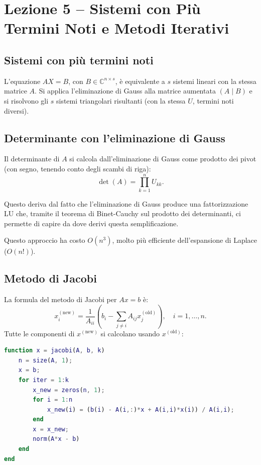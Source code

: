 \documentclass[12pt,a4paper,]{report}
\begin{document}
\section{Lezione 5 -- Sistemi con Più Termini Noti e Metodi Iterativi}

\subsection{Sistemi con più termini noti}

L'equazione $AX = B$, con $B \in \mathbb{C}^{n \times s}$, è equivalente a $s$
sistemi lineari con la stessa matrice $A$. Si applica l'eliminazione di Gauss alla matrice aumentata $(A \mid B)$ e si risolvono gli $s$ sistemi triangolari
risultanti (con la stessa $U$, termini noti diversi).

\subsection{Determinante con l'eliminazione di Gauss}

Il determinante di $A$ si calcola dall'eliminazione di Gauss come prodotto dei pivot (con segno, tenendo conto degli scambi di riga):
\[
  \det(A) = \prod_{k=1}^{n} U_{kk}.
\]
\begin{nota}
    Questo deriva dal fatto che l'eliminazione di Gauss produce una fattorizzazione LU che, tramite il teorema di Binet-Cauchy sul prodotto dei determinanti, ci permette di capire da dove derivi questa semplificazione.
\end{nota}
\noindent
Questo approccio ha costo $O(n^3)$, molto più efficiente dell'espansione di Laplace
($O(n!)$).

\subsection{Metodo di Jacobi}

La formula del metodo di Jacobi per $Ax = b$ è:
\[
  x_i^{(\text{new})} = \frac{1}{A_{ii}} \left( b_i - \sum_{j \neq i} A_{ij} x_j^{(\text{old})} \right), \quad i = 1, \ldots, n.
\]
Tutte le componenti di $x^{(\text{new})}$ si calcolano usando $x^{(\text{old})}$:
\begin{lstlisting}[language=Matlab]
function x = jacobi(A, b, k)
    n = size(A, 1);
    x = b;
    for iter = 1:k
        x_new = zeros(n, 1);
        for i = 1:n
            x_new(i) = (b(i) - A(i,:)*x + A(i,i)*x(i)) / A(i,i);
        end
        x = x_new;
        norm(A*x - b)
    end
end
\end{lstlisting}
\end{document}
